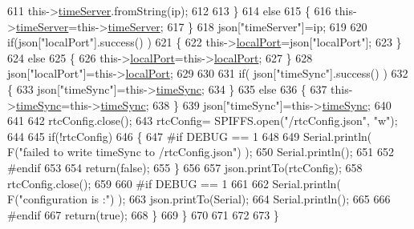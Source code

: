 \begin{DoxyCode}
611                 this->\hyperlink{class_cool_time_ad2b9858f399108cb440dd1e908916f04}{timeServer}.fromString(ip);
612                 
613             \}
614             \textcolor{keywordflow}{else}
615             \{
616                 this->\hyperlink{class_cool_time_ad2b9858f399108cb440dd1e908916f04}{timeServer}=this->\hyperlink{class_cool_time_ad2b9858f399108cb440dd1e908916f04}{timeServer};
617             \}
618             json[\textcolor{stringliteral}{"timeServer"}]=ip;
619             
620             \textcolor{keywordflow}{if}(json[\textcolor{stringliteral}{"localPort"}].success() )
621             \{                       
622                 this->\hyperlink{class_cool_time_a2f777da44d7ba678be8185299e9b49d1}{localPort}=json[\textcolor{stringliteral}{"localPort"}];
623             \}
624             \textcolor{keywordflow}{else}
625             \{
626                 this->\hyperlink{class_cool_time_a2f777da44d7ba678be8185299e9b49d1}{localPort}=this->\hyperlink{class_cool_time_a2f777da44d7ba678be8185299e9b49d1}{localPort};
627             \}
628             json[\textcolor{stringliteral}{"localPort"}]=this->\hyperlink{class_cool_time_a2f777da44d7ba678be8185299e9b49d1}{localPort};
629 
630 
631             \textcolor{keywordflow}{if}( json[\textcolor{stringliteral}{"timeSync"}].success() )
632             \{
633                 json[\textcolor{stringliteral}{"timeSync"}]=this->\hyperlink{class_cool_time_a9d032e76c3470a15b3bbbc52af6463f7}{timeSync};
634             \}
635             \textcolor{keywordflow}{else}
636             \{
637                 this->\hyperlink{class_cool_time_a9d032e76c3470a15b3bbbc52af6463f7}{timeSync}=this->\hyperlink{class_cool_time_a9d032e76c3470a15b3bbbc52af6463f7}{timeSync};
638             \}
639             json[\textcolor{stringliteral}{"timeSync"}]=this->\hyperlink{class_cool_time_a9d032e76c3470a15b3bbbc52af6463f7}{timeSync};
640 
641 
642             rtcConfig.close();
643             rtcConfig= SPIFFS.open(\textcolor{stringliteral}{"/rtcConfig.json"}, \textcolor{stringliteral}{"w"});
644             
645             \textcolor{keywordflow}{if}(!rtcConfig)
646             \{
647 \textcolor{preprocessor}{            #if DEBUG == 1}
648 
649                 Serial.println( F(\textcolor{stringliteral}{"failed to write timeSync to /rtcConfig.json"}) );
650                 Serial.println();
651             
652 \textcolor{preprocessor}{            #endif}
653 
654                 \textcolor{keywordflow}{return}(\textcolor{keyword}{false});
655             \}
656             
657             json.printTo(rtcConfig);
658             rtcConfig.close();
659     
660 \textcolor{preprocessor}{        #if DEBUG == 1}
661 
662             Serial.println( F(\textcolor{stringliteral}{"configuration is :"}) );
663             json.printTo(Serial);
664             Serial.println();
665         
666 \textcolor{preprocessor}{        #endif}
667             \textcolor{keywordflow}{return}(\textcolor{keyword}{true}); 
668         \}
669     \}   
670 
671 
672 
673 \}
\end{DoxyCode}
